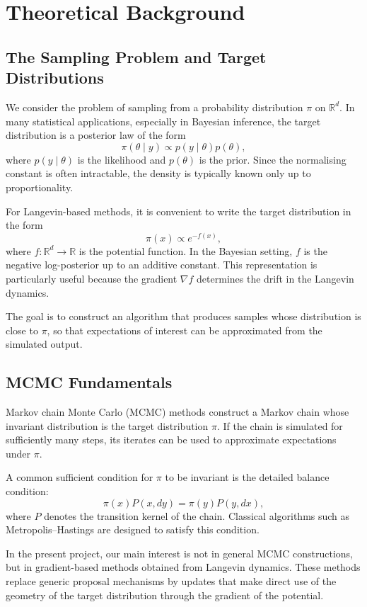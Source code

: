 \documentclass[a4paper,11pt, titlepage]{article}
\theoremstyle{definition}
\theoremstyle{plain}
\theoremstyle{remark}
\begin{document}
\section{Theoretical Background}
\label{sec:theory}

\subsection{The Sampling Problem and Target Distributions}

We consider the problem of sampling from a probability distribution $\pi$ on $\mathbb{R}^d$. In many statistical applications, especially in Bayesian inference, the target distribution is a posterior law of the form
\[
\pi(\theta\mid y)\propto p(y\mid \theta)p(\theta),
\]
where $p(y\mid\theta)$ is the likelihood and $p(\theta)$ is the prior. Since the normalising constant is often intractable, the density is typically known only up to proportionality.

For Langevin-based methods, it is convenient to write the target distribution in the form
\[
\pi(x)\propto e^{-f(x)},
\]
where $f:\mathbb{R}^d\to\mathbb{R}$ is the potential function. In the Bayesian setting, $f$ is the negative log-posterior up to an additive constant. This representation is particularly useful because the gradient $\nabla f$ determines the drift in the Langevin dynamics.

The goal is to construct an algorithm that produces samples whose distribution is close to $\pi$, so that expectations of interest can be approximated from the simulated output.

\subsection{MCMC Fundamentals}

Markov chain Monte Carlo (MCMC) methods construct a Markov chain whose invariant distribution is the target distribution $\pi$. If the chain is simulated for sufficiently many steps, its iterates can be used to approximate expectations under $\pi$.

A common sufficient condition for $\pi$ to be invariant is the detailed balance condition:
\[
\pi(x)P(x,dy)=\pi(y)P(y,dx),
\]
where $P$ denotes the transition kernel of the chain. Classical algorithms such as Metropolis--Hastings are designed to satisfy this condition.

In the present project, our main interest is not in general MCMC constructions, but in gradient-based methods obtained from Langevin dynamics. These methods replace generic proposal mechanisms by updates that make direct use of the geometry of the target distribution through the gradient of the potential.
\end{document}
